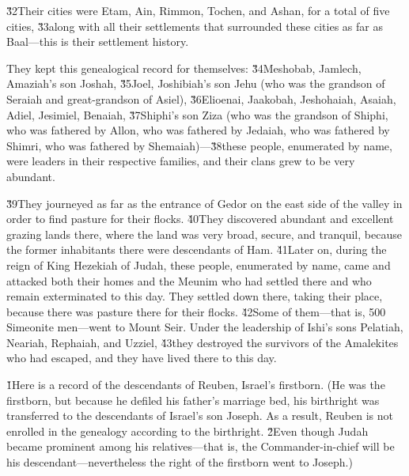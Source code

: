 \v{32}Their cities were Etam, Ain, Rimmon, Tochen, and Ashan, for a total of five cities, \v{33}along with all their settlements that surrounded these cities as far as Baal---this is their settlement history.

They kept this genealogical record for themselves: \v{34}Meshobab, Jamlech, Amaziah's son Joshah, \v{35}Joel, Joshibiah's son Jehu (who was the grandson of Seraiah and great-grandson of Asiel), \v{36}Elioenai, Jaakobah, Jeshohaiah, Asaiah, Adiel, Jesimiel, Benaiah, \v{37}Shiphi's son Ziza (who was the grandson of Shiphi, who was fathered by Allon, who was fathered by Jedaiah, who was fathered by Shimri, who was fathered by Shemaiah)---\v{38}these people, enumerated by name, were leaders in their respective families, and their clans grew to be very abundant.

\v{39}They journeyed as far as the entrance of Gedor on the east side of the valley in order to find pasture for their flocks. \v{40}They discovered abundant and excellent grazing lands there, where the land was very broad, secure, and tranquil, because the former inhabitants there were descendants of Ham. \v{41}Later on, during the reign of King Hezekiah of Judah, these people, enumerated by name, came and attacked both their homes and the Meunim who had settled there and who remain exterminated to this day. They settled down there, taking their place, because there was pasture there for their flocks. \v{42}Some of them---that is, 500 Simeonite men---went to Mount Seir. Under the leadership of Ishi's sons Pelatiah, Neariah, Rephaiah, and Uzziel, \v{43}they destroyed the survivors of the Amalekites who had escaped, and they have lived there to this day.

\v{1}Here is a record of the descendants of Reuben, Israel's firstborn. (He was the firstborn, but because he defiled his father's marriage bed, his birthright was transferred to the descendants of Israel's son Joseph. As a result, Reuben is not enrolled in the genealogy according to the birthright. \v{2}Even though Judah became prominent among his relatives---that is, the Commander-in-chief will be his descendant---nevertheless the right of the firstborn went to Joseph.)

